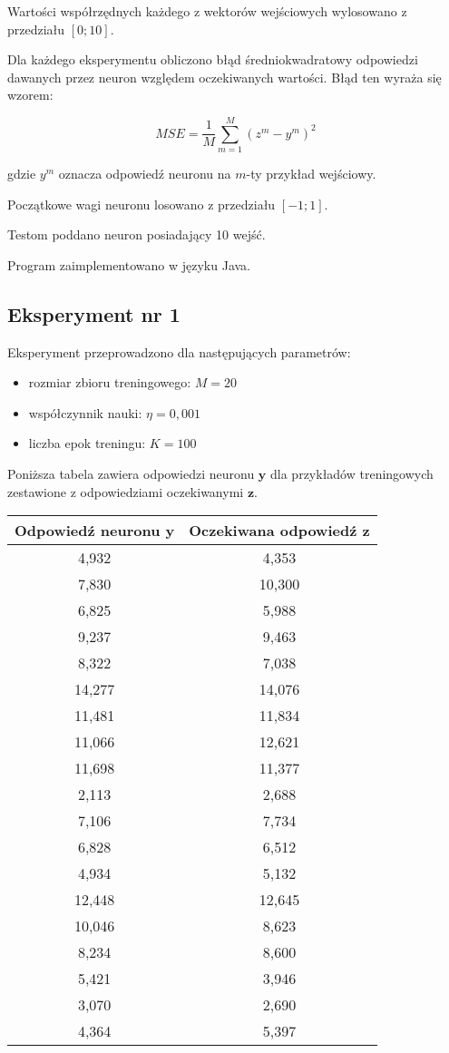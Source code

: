 \documentclass[12pt]{article}
\begin{document}
Wartości współrzędnych każdego z wektorów wejściowych wylosowano z przedziału $[0; 10]$.

Dla każdego eksperymentu obliczono błąd średniokwadratowy odpowiedzi dawanych przez neuron względem oczekiwanych wartości. Błąd ten wyraża się wzorem:

\[ MSE = \frac{1}{M}\sum_{m=1}^M (z^m - y^m)^2 \]

gdzie $y^m$ oznacza odpowiedź neuronu na $m$-ty przykład wejściowy.

Początkowe wagi neuronu losowano z przedziału $[-1; 1]$. 

Testom poddano neuron posiadający 10 wejść.

Program zaimplementowano w języku Java.

\subsection{Eksperyment nr 1}

Eksperyment przeprowadzono dla następujących parametrów:

\begin{itemize}
\item rozmiar zbioru treningowego: $M = 20$ 
\item współczynnik nauki: $\eta = 0,001$
\item liczba epok treningu: $K = 100$
\end{itemize}

Poniższa tabela zawiera odpowiedzi neuronu $\textbf{y}$ dla przykładów treningowych zestawione z odpowiedziami oczekiwanymi $\textbf{z}$.

\clearpage

\begin{table}
\begin{tabular}{|c|c|}
\hline 
Odpowiedź neuronu $\textbf{y}$ & Oczekiwana odpowiedź $\textbf{z}$ \\ 
\hline 
4,932 & 4,353 \\ \hline 
7,830 & 10,300 \\ \hline 
6,825 & 5,988 \\ \hline 
9,237 & 9,463 \\ \hline 
8,322 & 7,038 \\ \hline 
14,277 & 14,076 \\ \hline 
11,481 & 11,834 \\ \hline 
11,066 & 12,621 \\ \hline 
11,698 & 11,377 \\ \hline 
2,113 & 2,688 \\ \hline 
7,106 & 7,734 \\ \hline 
6,828 & 6,512 \\ \hline 
4,934 & 5,132 \\ \hline 
12,448 & 12,645 \\ \hline 
10,046 & 8,623 \\ \hline 
8,234 & 8,600 \\ \hline 
5,421 & 3,946 \\ \hline 
3,070 & 2,690 \\ \hline 
4,364 & 5,397 \\ \hline
\end{tabular} 
\end{table}
\end{document}
